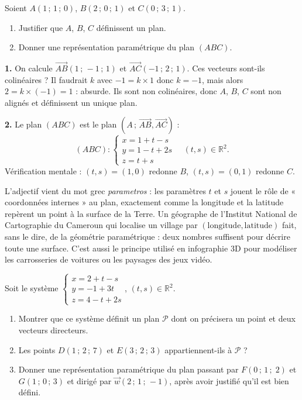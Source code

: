 \documentclass[11pt]{article}
\begin{document}
\begin{exoresolu}
Soient $A(1\,;\,1\,;\,0)$, $B(2\,;\,0\,;\,1)$ et $C(0\,;\,3\,;\,1)$.
\begin{enumerate}
  \item Justifier que $A$, $B$, $C$ définissent un plan.
  \item Donner une représentation paramétrique du plan $(ABC)$.
\end{enumerate}
\tcblower
\textbf{1.} On calcule $\overrightarrow{AB}(1\,;\,-1\,;\,1)$ et $\overrightarrow{AC}(-1\,;\,2\,;\,1)$. Ces vecteurs sont-ils colinéaires ? Il faudrait $k$ avec $-1 = k \times 1$ donc $k = -1$, mais alors $2 = k \times (-1) = 1$ : absurde. Ils sont non colinéaires, donc $A$, $B$, $C$ sont non alignés et définissent un unique plan.

\textbf{2.} Le plan $(ABC)$ est le plan $(A\,;\,\overrightarrow{AB},\overrightarrow{AC})$ :
\[ (ABC) : \begin{cases} x = 1 + t - s \\ y = 1 - t + 2s \\ z = t + s \end{cases} \quad (t,s) \in \mathbb{R}^2. \]
Vérification mentale : $(t,s) = (1,0)$ redonne $B$, $(t,s) = (0,1)$ redonne $C$.
\end{exoresolu}

\begin{savaistu}
L'adjectif vient du mot grec \emph{parametros} : les paramètres $t$ et $s$ jouent le rôle de « coordonnées internes » au plan, exactement comme la longitude et la latitude repèrent un point à la surface de la Terre. Un géographe de l'Institut National de Cartographie du Cameroun qui localise un village par $(\text{longitude}, \text{latitude})$ fait, sans le dire, de la géométrie paramétrique : deux nombres suffisent pour décrire toute une surface. C'est aussi le principe utilisé en infographie 3D pour modéliser les carrosseries de voitures ou les paysages des jeux vidéo.
\end{savaistu}

\begin{exercice}
Soit le système $\begin{cases} x = 2 + t - s \\ y = -1 + 3t \\ z = 4 - t + 2s \end{cases}$, $(t,s) \in \mathbb{R}^2$.
\begin{enumerate}
  \item Montrer que ce système définit un plan $\mathcal{P}$ dont on précisera un point et deux vecteurs directeurs.
  \item Les points $D(1\,;\,2\,;\,7)$ et $E(3\,;\,2\,;\,3)$ appartiennent-ils à $\mathcal{P}$ ?
  \item Donner une représentation paramétrique du plan passant par $F(0\,;\,1\,;\;2)$ et $G(1\,;\,0\,;\,3)$ et dirigé par $\vec{w}(2\,;\,1\,;\,-1)$, après avoir justifié qu'il est bien défini.
\end{enumerate}
\end{exercice}
\end{document}
